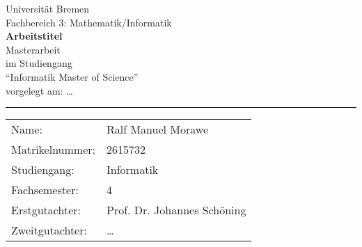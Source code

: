 \begin{titlepage}
\begin{center}
	\LARGE Universität Bremen\\
	\large Fachbereich 3: Mathematik/Informatik\\
	\vspace{2cm}
	\LARGE\textsf{\textbf{Arbeitstitel}} \\
	\vspace{2cm}
	\LARGE Masterarbeit\\
	\vspace{0.5cm}
	\large
	im Studiengang\\
	\enquote{Informatik Master of Science}\\
	\vspace{1cm}
	\normalsize
	vorgelegt am: \dots \\
	\vspace{3.5cm}
\end{center}
\vfill
\noindent
\hrule
\vspace{1em}
\begin{tabular}{ll}
	Name: & {Ralf Manuel Morawe} \\
	Matrikelnummer: & {2615732} \\
	Studiengang: & Informatik\\
	Fachsemester: & 4\\
	Erstgutachter: & {Prof. Dr. Johannes Schöning} \\
	Zweitgutachter: & {\dots}
\end{tabular}
\end{titlepage}
\cleardoublepage
